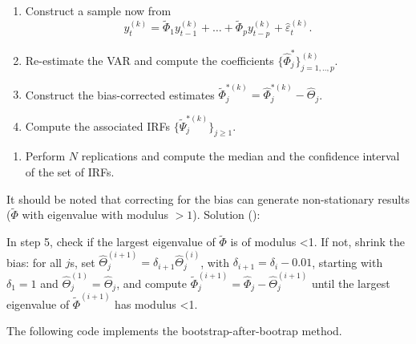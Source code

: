\documentclass[
  11pt,
]{book}
\providecommand{\tightlist}{%
  \setlength{\itemsep}{0pt}\setlength{\parskip}{0pt}}
\theoremstyle{definition}
\theoremstyle{definition}
\theoremstyle{definition}
\theoremstyle{definition}
\theoremstyle{remark}
\begin{document}
\begin{enumerate}
\def\labelenumi{\alph{enumi}.}
\tightlist
\item
  Construct a sample now from
  \[
  y_t^{(k)}=\widetilde{\Phi}_1 y_{t-1}^{(k)} + \dots + \widetilde{\Phi}_p y_{t-p}^{(k)} + \hat\varepsilon_t^{(k)}.
  \]
\item
  Re-estimate the VAR and compute the coefficients \(\{\widehat{\Phi}^*_j\}_{j=1,..,p}^{(k)}\).
\item
  Construct the bias-corrected estimates \(\widetilde{\Phi}_j^{*(k)}=\widehat{\Phi}_j^{*(k)}-\widehat{\Theta}_j\).
\item
  Compute the associated IRFs \(\{\widetilde{\Psi}_j^{*(k)}\}_{j\ge 1}\).
\end{enumerate}

\begin{enumerate}
\def\labelenumi{\arabic{enumi}.}
\setcounter{enumi}{6}
\tightlist
\item
  Perform \(N\) replications and compute the median and the confidence interval of the set of IRFs.
\end{enumerate}

It should be noted that correcting for the bias can generate non-stationary results (\(\tilde \Phi\) with eigenvalue with modulus \(>1\)). Solution (\citet{Kilian_1998}):

In step 5, check if the largest eigenvalue of \(\tilde\Phi\) is of modulus \textless1.
If not, shrink the bias: for all \(j\)s, set \(\widehat{\Theta}_j^{(i+1)}=\delta_{i+1}\widehat{\Theta}_j^{(i)}\), with \(\delta_{i+1}=\delta_i-0.01\), starting with \(\delta_1=1\) and \(\widehat{\Theta}_j^{(1)} =\widehat{\Theta}_j\), and compute \(\widetilde{\Phi}_j^{(i+1)}=\widehat{\Phi}_j-\widehat{\Theta}_j^{(i+1)}\) until the largest eigenvalue of \(\tilde\Phi^{(i+1)}\) has modulus \textless1.

The following code implements the bootstrap-after-bootrap method.
\end{document}
